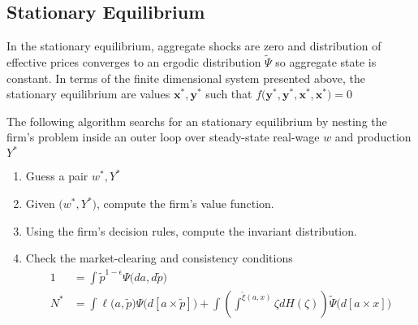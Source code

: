\documentclass[a4paper,10pt]{article}  %
\begin{document}

\subsection{Stationary Equilibrium} %
\label{sub:stationary_equilibrium}

In the stationary equilibrium, aggregate shocks are zero and distribution of effective prices converges to an ergodic distribution $
\widetilde{\Psi} $ so aggregate state is constant. In terms of the finite dimensional system presented above, the stationary equilibrium are values
$ \mathbf{x}^*,\mathbf{y}^* $ such that $ f \big( \mathbf{y}^*,\mathbf{y}^*, \mathbf{x}^*, \mathbf{x}^* \big) = 0 $

The following algorithm searchs for an stationary equilibrium by nesting the firm's problem inside an outer loop over steady-state
real-wage $w$ and production $ Y^* $
\begin{enumerate}
   
   \item Guess a pair $ w^*,Y^* $
   \item Given $ \Big(w^*,Y^* \Big) $, compute the firm's value function.
   \item Using the firm's decision rules, compute the invariant distribution.
   \item Check the market-clearing and consistency conditions
      \begin{align*}
         1 & = \int \tilde{p}^{1-\epsilon} \Psi\big(da, d\tilde{p} \big) \\
         N^* & = 
         \int \ell \big( a, \tilde{p} \big) \Psi \big(d[a\times\tilde{p}] \big) + 
         \int \left( \int^{\tilde{\xi}( a, x) } \zeta dH( \zeta) \right) \widetilde{\Psi} \big( d[a\times x] \big)
      \end{align*}
\end{enumerate}
\end{document}
